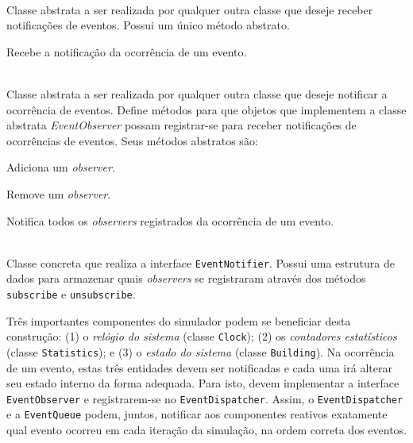 \begin{description}\setlength\itemsep{0mm}
  \item[EventObserver] \hfill \\
    Classe abstrata a ser realizada por qualquer outra classe que deseje receber
    notificações de eventos. Possui um único método abstrato.

    \begin{description}[leftmargin=!,labelwidth=\widthof{\bfseries unsubscribe}]\setlength\itemsep{0mm}
      \item[\texttt{notify}] Recebe a notificação da ocorrência de um evento.
    \end{description}

  \item[EventNotifier] \hfill \\
    Classe abstrata a ser realizada por qualquer outra classe que deseje
    notificar a ocorrência de eventos. Define métodos para que objetos que
    implementem a classe abstrata \textit{EventObserver} possam registrar-se
    para receber notificações de ocorrências de eventos. Seus métodos abstratos
    são:

    \begin{description}[leftmargin=!,labelwidth=\widthof{\bfseries unsubscribe}]\setlength\itemsep{0mm}
      \item[\texttt{subscribe}] Adiciona um \textit{observer}.
      \item[\texttt{unsubscribe}] Remove um \textit{observer}.
      \item[\texttt{broadcast}] Notifica todos os \textit{observers} registrados da ocorrência de um evento.
    \end{description}

  \item[EventDispatcher] \hfill \\
    Classe concreta que realiza a interface \texttt{EventNotifier}. Possui uma
    estrutura de dados para armazenar quais \textit{observers} se registraram
    através dos métodos \texttt{subscribe} e \texttt{unsubscribe}.
\end{description}

Três importantes componentes do simulador podem se beneficiar desta construção:
(1) o \textit{relógio do sistema} (classe \texttt{Clock}); (2) os
\textit{contadores estatísticos} (classe \texttt{Statistics}); e (3) o
\textit{estado do sistema} (classe \texttt{Building}). Na ocorrência de um
evento, estas três entidades devem ser notificadas e cada uma irá alterar seu
estado interno da forma adequada. Para isto, devem implementar a interface
\texttt{EventObserver} e registrarem-se no \texttt{EventDispatcher}. Assim, o
\texttt{EventDispatcher} e a \texttt{EventQueue} podem, juntos, notificar aos
componentes reativos exatamente qual evento ocorreu em cada iteração da
simulação, na ordem correta dos eventos.

